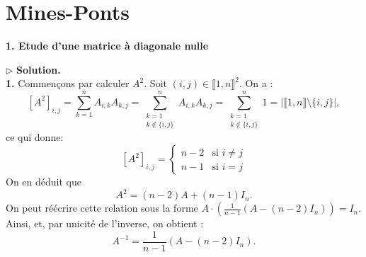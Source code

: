 \documentclass[11pt,a4paper]{report}
\begin{document}
\chapter{Mines-Ponts}

\begin{center}
    \large \textbf{1. Etude d'une matrice à diagonale nulle}
\end{center}
\vspace{0.2cm}

\noindent{}
\vspace{0.4cm}

\noindent $\triangleright$ \textbf{Solution.} \\
\textbf{1.} Commençons par calculer $A^2$. Soit $(i,j) \in \llbracket 1,n \rrbracket^2$. On a :
\[
[A^2]_{i,j} = \sum_{k=1}^n A_{i,k} A_{k,j} = \sum_{\substack{k=1 \\ k \notin \{i,j\}}}^n A_{i,k} A_{k,j} = \sum_{\substack{k=1 \\ k \notin \{i,j\}}}^n 1 = \left| \llbracket 1,n \rrbracket \setminus \{i,j\} \right|,
\]
ce qui donne:
\[
[A^2]_{i,j} = \begin{cases} n-2 & \text{si } i \neq j \\ n-1 & \text{si } i = j \end{cases}
\]
On en déduit que 
\[
A^2 = (n-2)A + (n-1)I_n.
\]
On peut réécrire cette relation sous la forme $A \cdot \left( \frac{1}{n-1}(A - (n-2)I_n) \right) = I_n$. Ainsi,  et, par unicité de l'inverse, on obtient :
\[
\boxed{A^{-1} = \frac{1}{n-1}(A - (n-2)I_n).}
\]
\end{document}
